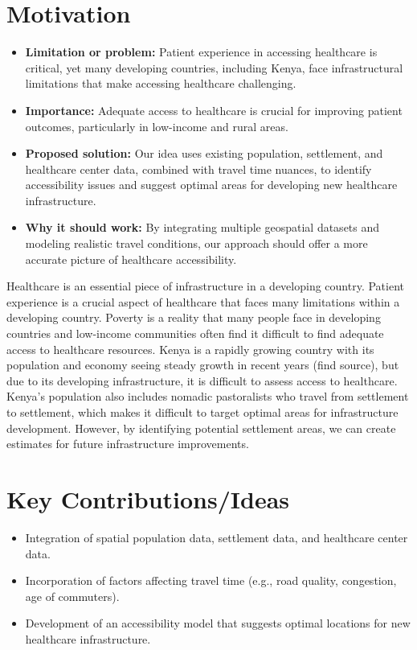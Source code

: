 \documentclass[11pt]{article}
\begin{document}
\section{Motivation}
\begin{itemize}
    \item \textbf{Limitation or problem:} Patient experience in accessing healthcare is critical, yet many developing countries, including Kenya, face infrastructural limitations that make accessing healthcare challenging.
    \item \textbf{Importance:} Adequate access to healthcare is crucial for improving patient outcomes, particularly in low-income and rural areas.
    \item \textbf{Proposed solution:} Our idea uses existing population, settlement, and healthcare center data, combined with travel time nuances, to identify accessibility issues and suggest optimal areas for developing new healthcare infrastructure.
    \item \textbf{Why it should work:} By integrating multiple geospatial datasets and modeling realistic travel conditions, our approach should offer a more accurate picture of healthcare accessibility.
\end{itemize}

Healthcare is an essential piece of infrastructure in a developing country. Patient experience is a crucial aspect of healthcare that faces many limitations within a developing country. Poverty is a reality that many people face in developing countries and low-income communities often find it difficult to find adequate access to healthcare resources. Kenya is a rapidly growing country with its population and economy seeing steady growth in recent years (find source), but due to its developing infrastructure, it is difficult to assess access to healthcare. Kenya’s population also includes nomadic pastoralists who travel from settlement to settlement, which makes it difficult to target optimal areas for infrastructure development. However, by identifying potential settlement areas, we can create estimates for future infrastructure improvements.

\section{Key Contributions/Ideas}
\begin{itemize}
    \item Integration of spatial population data, settlement data, and healthcare center data.
    \item Incorporation of factors affecting travel time (e.g., road quality, congestion, age of commuters).
    \item Development of an accessibility model that suggests optimal locations for new healthcare infrastructure.
\end{itemize}
\end{document}
